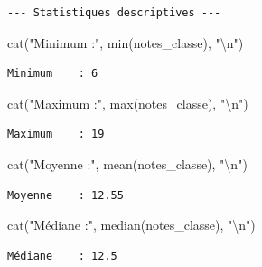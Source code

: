 \documentclass[
  french,
  11pt,
  a4paper,
]{article}
\newenvironment{Shaded}{}{}
\newcommand{\FunctionTok}[1]{\textcolor[rgb]{0.44,0.26,0.76}{#1}}
\newcommand{\NormalTok}[1]{\textcolor[rgb]{0.14,0.16,0.18}{#1}}
\newcommand{\SpecialCharTok}[1]{\textcolor[rgb]{0.00,0.36,0.77}{#1}}
\newcommand{\StringTok}[1]{\textcolor[rgb]{0.01,0.18,0.38}{#1}}
\begin{document}
\begin{verbatim}
--- Statistiques descriptives ---
\end{verbatim}

\begin{Shaded}
\begin{Highlighting}[]
\FunctionTok{cat}\NormalTok{(}\StringTok{"Minimum    :"}\NormalTok{, }\FunctionTok{min}\NormalTok{(notes\_classe), }\StringTok{"}\SpecialCharTok{\textbackslash{}n}\StringTok{"}\NormalTok{)}
\end{Highlighting}
\end{Shaded}

\begin{verbatim}
Minimum    : 6 
\end{verbatim}

\begin{Shaded}
\begin{Highlighting}[]
\FunctionTok{cat}\NormalTok{(}\StringTok{"Maximum    :"}\NormalTok{, }\FunctionTok{max}\NormalTok{(notes\_classe), }\StringTok{"}\SpecialCharTok{\textbackslash{}n}\StringTok{"}\NormalTok{)}
\end{Highlighting}
\end{Shaded}

\begin{verbatim}
Maximum    : 19 
\end{verbatim}

\begin{Shaded}
\begin{Highlighting}[]
\FunctionTok{cat}\NormalTok{(}\StringTok{"Moyenne    :"}\NormalTok{, }\FunctionTok{mean}\NormalTok{(notes\_classe), }\StringTok{"}\SpecialCharTok{\textbackslash{}n}\StringTok{"}\NormalTok{)}
\end{Highlighting}
\end{Shaded}

\begin{verbatim}
Moyenne    : 12.55 
\end{verbatim}

\begin{Shaded}
\begin{Highlighting}[]
\FunctionTok{cat}\NormalTok{(}\StringTok{"Médiane    :"}\NormalTok{, }\FunctionTok{median}\NormalTok{(notes\_classe), }\StringTok{"}\SpecialCharTok{\textbackslash{}n}\StringTok{"}\NormalTok{)}
\end{Highlighting}
\end{Shaded}

\begin{verbatim}
Médiane    : 12.5 
\end{verbatim}
\end{document}
